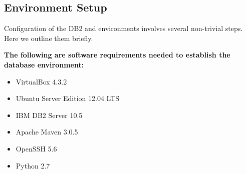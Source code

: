 \documentclass[letterpaper]{article}%
\begin{document}
\subsection{Environment Setup}

Configuration of the DB2 and \RWUApp{} environments involves several non-trivial
steps. Here we outline them briefly.
\vspace{1em}

\textbf{The following are software requirements needed to establish the database
environment:}
\begin{itemize} \itemsep -0.25em
  \item VirtualBox 4.3.2
  \item Ubuntu Server Edition 12.04 LTS
  \item IBM DB2 Server 10.5
  \item Apache Maven 3.0.5
  \item OpenSSH 5.6
  \item Python 2.7
\end{itemize}
\vspace{1em}
\end{document}
